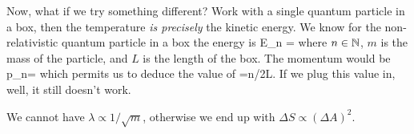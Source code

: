 Now, what if we try something different? Work with a single
quantum particle in a box, then the temperature {\it is precisely}
the kinetic energy. We know for the non-relativistic quantum
particle in a box the energy is
\equation
E_n = 
\endequation
where $n\in\Bbb{N}$, $m$ is the mass of the particle, and $L$ is
the length of the box. The momentum would be
\equation
p_{n}=\hbar{}
\endequation
which permits us to deduce the value of 
\equation
\lambda=n/2L.
\endequation
If we plug this value in, well, it still doesn't work.

\solution
We cannot have $\lambda\propto1/\sqrt{m}$, otherwise we end up
with $\Delta S\propto (\Delta A)^{2}$.
\endsolution
